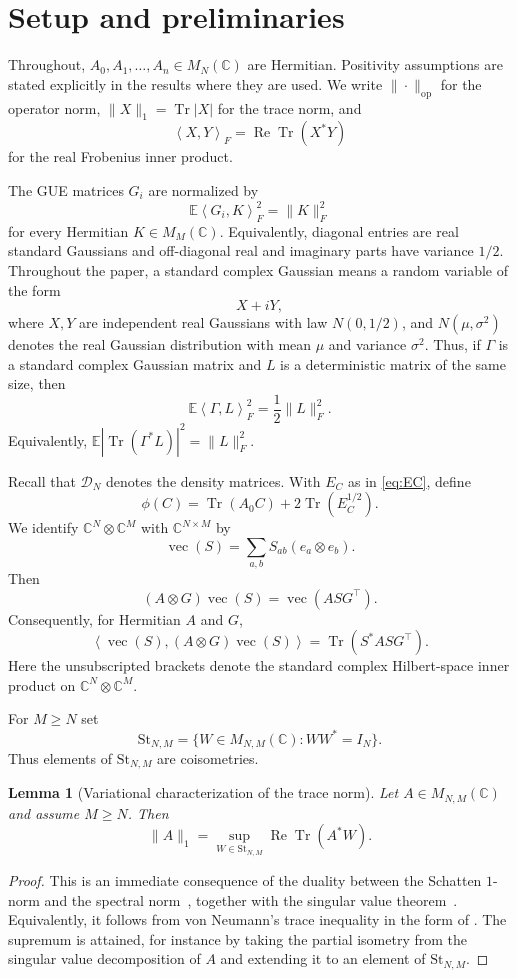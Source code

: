 \documentclass{article}
\newtheorem{lemma}[theorem]{Lemma}
\newcommand{\C}{\mathbb C}
\newcommand{\E}{\mathbb E}
\newcommand{\DN}{\mathcal D_N}
\newcommand{\St}{\mathrm{St}}
\newcommand{\op}{\mathrm{op}}
\newcommand{\ip}[2]{\left\langle #1,#2\right\rangle}
\DeclareMathOperator{\Tr}{Tr}
\DeclareMathOperator{\Rea}{Re}
\DeclareMathOperator{\vecop}{vec}
\begin{document}
\section{Setup and preliminaries}
\label{sec:setup}

Throughout, $A_0,A_1,\ldots,A_n\in M_N(\C)$ are Hermitian.  Positivity
assumptions are stated explicitly in the results where they are used.  We write
$\|\cdot\|_{\op}$ for the operator norm,
$\|X\|_1=\Tr|X|$ for the trace norm, and
\[
	\ip{X}{Y}_F=\Rea\Tr(X^*Y)
\]
for the real Frobenius inner product.

The GUE matrices $G_i$ are normalized by
\[
	\E\ip{G_i}{K}_F^2=\|K\|_F^2
\]
for every Hermitian $K\in M_M(\C)$.  Equivalently, diagonal entries are real
standard Gaussians and off-diagonal real and imaginary parts have variance
$1/2$.  Throughout the paper, a standard complex Gaussian means a random
variable of the form
\[
	X+iY,
\]
where $X,Y$ are independent real Gaussians with law $N(0,1/2)$, and
$N(\mu,\sigma^2)$ denotes the real Gaussian distribution with mean $\mu$ and
variance $\sigma^2$.  Thus, if $\Gamma$ is a standard complex Gaussian matrix
and $L$ is a deterministic matrix of the same size, then
\[
	\E\ip{\Gamma}{L}_F^2
	=
	\frac12\|L\|_F^2.
\]
Equivalently, $\E|\Tr(\Gamma^*L)|^2=\|L\|_F^2$.

Recall that \(\DN\) denotes the density matrices.  With \(E_C\) as in
\eqref{eq:EC}, define
\[
	\phi(C)=\Tr(A_0C)+2\Tr(E_C^{1/2}).
\]
We identify $\C^N\otimes\C^M$ with $\C^{N\times M}$ by
\[
	\vecop(S)=\sum_{a,b}S_{ab}(e_a\otimes e_b).
\]
Then
\[
	(A\otimes G)\vecop(S)=\vecop(ASG^{\top}).
\]
Consequently, for Hermitian $A$ and $G$,
\[
	\ip{\vecop(S)}{(A\otimes G)\vecop(S)}
	=\Tr(S^*ASG^{\top}).
\]
Here the unsubscripted brackets denote the standard complex Hilbert-space
inner product on \(\C^N\otimes\C^M\).

For $M\ge N$ set
\[
	\St_{N,M}=\{W\in M_{N,M}(\C): WW^*=I_N\}.
\]
Thus elements of $\St_{N,M}$ are coisometries.

\begin{lemma}[Variational characterization of the trace norm]
	\label{lem:trace-norm-variational}
	Let $A\in M_{N,M}(\C)$ and assume $M\ge N$.  Then
	\[
		\|A\|_1=\sup_{W\in\St_{N,M}}\Rea\Tr(A^*W).
	\]
\end{lemma}
\begin{proof}
	This is an immediate consequence of the duality between the Schatten
	$1$-norm and the spectral norm~\cite[(1.173)]{Watrous2018}, together with the
	singular value theorem~\cite[Theorem~1.6]{Watrous2018}.  Equivalently, it
	follows from von Neumann's trace inequality in the form of
	\cite[Theorem~IV.2.5]{Bhatia1997}.  The supremum is attained, for instance
	by taking the partial isometry from the singular value decomposition of
	\(A\) and extending it to an element of \(\St_{N,M}\).
\end{proof}
\end{document}

